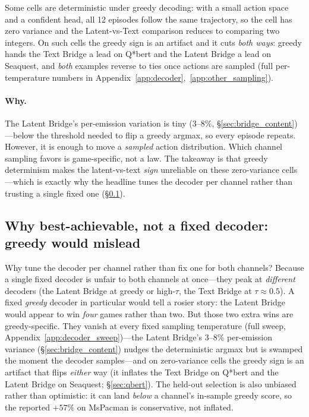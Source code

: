 \documentclass[11pt]{article}
\begin{document}
Some cells are deterministic under greedy decoding: with a small action space and a confident
head, all 12 episodes follow the same trajectory, so the cell has zero variance and the
Latent-vs-Text comparison reduces to comparing two integers. On such cells the greedy sign is an
artifact and it cuts \emph{both ways}: greedy hands the Text Bridge a lead on Q*bert and the
Latent Bridge a lead on Seaquest, and \emph{both} examples reverse to ties once actions are sampled (full
per-temperature numbers in Appendix~\ref{app:decoder},~\ref{app:other_sampling}).

\paragraph{Why.} The Latent Bridge's per-emission variation is tiny (3--8\%,
\S\ref{sec:bridge_content})---below the threshold needed to flip a greedy argmax, so every episode
repeats. However, it is enough to move a \emph{sampled} action distribution. Which channel sampling
favors is game-specific, not a law. The takeaway is that greedy determinism makes the
latent-vs-text \emph{sign} unreliable on these zero-variance cells---which is exactly why the
headline tunes the decoder per channel rather than trusting a single fixed one
(\S\ref{sec:best_achievable}).

\subsection{Why best-achievable, not a fixed decoder: greedy would mislead}
\label{sec:best_achievable}

Why tune the decoder per channel rather than fix one for both channels? Because a single fixed decoder is unfair to
both channels at once---they peak at \emph{different} decoders (the Latent Bridge at greedy or
high-$\tau$, the Text Bridge at $\tau\!\approx\!0.5$). A fixed \emph{greedy} decoder in particular
would tell a rosier story: the Latent Bridge would appear to win \emph{four} games rather than two.
But those two extra wins are greedy-specific. They vanish at every fixed sampling temperature (full
sweep, Appendix~\ref{app:decoder_sweep})---the Latent Bridge's $3$--$8\%$ per-emission variance
(\S\ref{sec:bridge_content}) nudges the deterministic argmax but is swamped the moment the decoder
samples---and on zero-variance cells the greedy sign is an artifact that flips \emph{either} way
(it inflates the Text Bridge on Q*bert and the Latent Bridge on Seaquest; \S\ref{sec:qbert}). The
held-out selection is also unbiased rather than optimistic: it can land \emph{below} a channel's
in-sample greedy score, so the reported $+57\%$ on MsPacman is conservative, not inflated.
\end{document}
